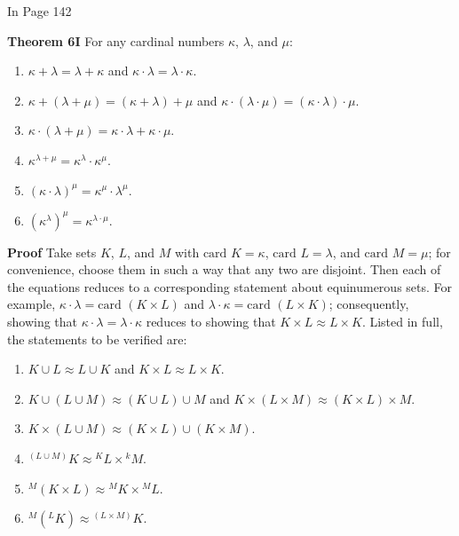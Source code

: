 In Page 142
\begin{leftbar}
    \textbf{Theorem 6I} For any cardinal numbers \(\kappa\), \(\lambda\), and \(\mu\):

    \begin{enumerate}
        \item \(\kappa + \lambda = \lambda + \kappa\) and \(\kappa \cdot \lambda = \lambda \cdot \kappa\).
        \item \(\kappa + (\lambda + \mu) = (\kappa + \lambda) + \mu\) and \(\kappa \cdot (\lambda \cdot \mu) = (\kappa \cdot \lambda) \cdot \mu\).
        \item \(\kappa \cdot (\lambda + \mu) = \kappa \cdot \lambda + \kappa \cdot \mu\).
        \item \(\kappa^{\lambda + \mu} = \kappa^\lambda \cdot \kappa^\mu\).
        \item \((\kappa \cdot \lambda)^\mu = \kappa^\mu \cdot \lambda^\mu\).
        \item \((\kappa^\lambda)^\mu = \kappa^{\lambda \cdot \mu}\).
    \end{enumerate}

    \textbf{Proof} Take sets \(K\), \(L\), and \(M\) with \(\text{card } K = \kappa\), \(\text{card } L = \lambda\), and \(\text{card } M = \mu\); for convenience, choose them in such a way that any two are disjoint. Then each of the equations reduces to a corresponding statement about equinumerous sets. For example, \(\kappa \cdot \lambda = \text{card } (K \times L)\) and \(\lambda \cdot \kappa = \text{card } (L \times K)\); consequently, showing that \(\kappa \cdot \lambda = \lambda \cdot \kappa\) reduces to showing that \(K \times L \approx L \times K\). Listed in full, the statements to be verified are:

    \begin{enumerate}
        \item \(K \cup L \approx L \cup K\) and \(K \times L \approx L \times K\).
        \item \(K \cup (L \cup M) \approx (K \cup L) \cup M\) and \(K \times (L \times M) \approx (K \times L) \times M\).
        \item \(K \times (L \cup M) \approx (K \times L) \cup (K \times M)\).
        \item \({}^{(L \cup M)} K \approx {}^K L \times {}^k M\).
        \item \({}^M (K \times L) \approx {}^M K \times {}^M L\).
        \item \({}^{M} ({}^L K) \approx {}^{(L \times M)} K\).
    \end{enumerate}
\end{leftbar}
